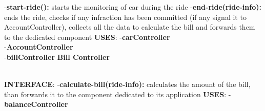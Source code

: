 \documentclass{article}
\begin{document}
 \newline
-\textbf{start-ride():} starts the monitoring of car during the ride 
\newline
-\textbf{end-ride(ride-info):} ends the ride, checks if any infraction has been committed (if any signal it to AccountController), collects all the data to calculate the bill and forwards them to the dedicated component
\newline
\textbf{USES}:   
\newline
-\textbf{carController}\\
-\textbf{AccountController}\\
-\textbf{billController}
\newpage
\textbf{Bill Controller}\\
\begin{figure}[ht]
\end{figure}\\
\textbf{INTERFACE}: 
 \newline
-\textbf{calculate-bill(ride-info):} calculates the amount of the bill, than forwards it to the component dedicated to its application  
\newline
\textbf{USES}:   
\newline
-\textbf{balanceController}
\newpage
\end{document}
